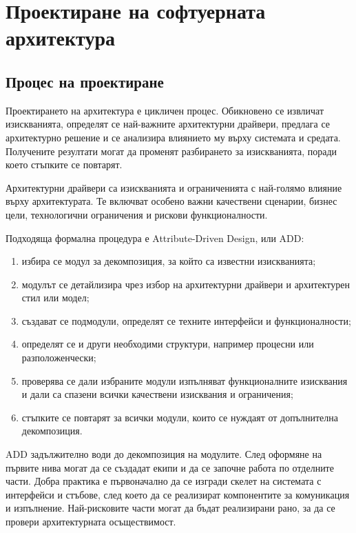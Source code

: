 \section{Проектиране на софтуерната архитектура}\label{s:27.6}

\subsection{Процес на проектиране}\label{s:27.6.1}

Проектирането на архитектура е цикличен процес. Обикновено се извличат изискванията, определят се най-важните архитектурни драйвери, предлага се архитектурно решение и се анализира влиянието му върху системата и средата. Получените резултати могат да променят разбирането за изискванията, поради което стъпките се повтарят.

Архитектурни драйвери са изискванията и ограниченията с най-голямо влияние върху архитектурата. Те включват особено важни качествени сценарии, бизнес цели, технологични ограничения и рискови функционалности.

Подходяща формална процедура е Attribute-Driven Design, или ADD:

\begin{enumerate}
    \item избира се модул за декомпозиция, за който са известни изискванията;
    \item модулът се детайлизира чрез избор на архитектурни драйвери и архитектурен стил или модел;
    \item създават се подмодули, определят се техните интерфейси и функционалности;
    \item определят се и други необходими структури, например процесни или разположенчески;
    \item проверява се дали избраните модули изпълняват функционалните изисквания и дали са спазени всички качествени изисквания и ограничения;
    \item стъпките се повтарят за всички модули, които се нуждаят от допълнителна декомпозиция.
\end{enumerate}

ADD задължително води до декомпозиция на модулите. След оформяне на първите нива могат да се създадат екипи и да се започне работа по отделните части. Добра практика е първоначално да се изгради скелет на системата с интерфейси и стъбове, след което да се реализират компонентите за комуникация и изпълнение. Най-рисковите части могат да бъдат реализирани рано, за да се провери архитектурната осъществимост.


